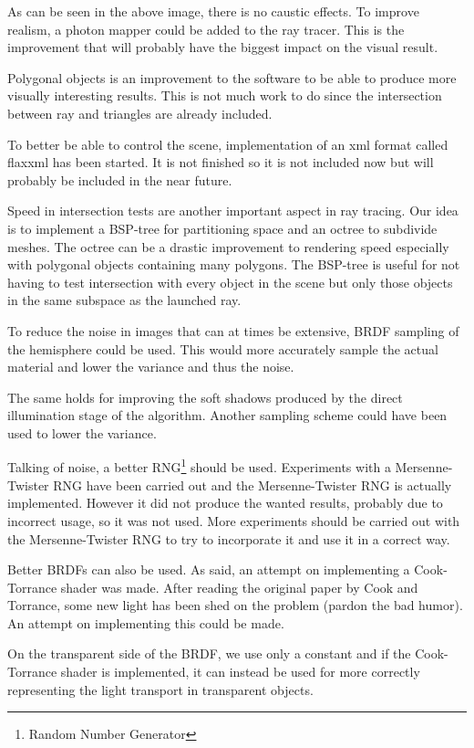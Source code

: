 \documentclass[a4paper]{report}
\begin{document}
As can be seen in the above image, there is no caustic effects. To
improve realism, a photon mapper could be added to the ray
tracer. This is the improvement that will probably have the biggest
impact on the visual result.

Polygonal objects is an improvement to the software to be able to
produce more visually interesting results. This is not much work to do
since the intersection between ray and triangles are already included.

To better be able to control the scene, implementation of an xml
format called flaxxml has been started. It is not finished so it is
not included now but will probably be included in the near future.

Speed in intersection tests are another important aspect in ray
tracing. Our idea is to implement a BSP-tree for partitioning space
and an octree to subdivide meshes. The octree can be a drastic improvement
to rendering speed especially with polygonal objects containing many
polygons. The BSP-tree is useful for not having to test intersection
with every object in the scene but only those objects in the same
subspace as the launched ray.

To reduce the noise in images that can at times be extensive, BRDF
sampling of the hemisphere could be used. This would more accurately
sample the actual material and lower the variance and thus the noise.

The same holds for improving the soft shadows produced by the direct
illumination stage of the algorithm. Another sampling scheme could
have been used to lower the variance.

Talking of noise, a better RNG\footnote{Random Number Generator} should be
used. Experiments with a Mersenne-Twister RNG have been carried out
and the Mersenne-Twister RNG is actually implemented. However it did
not produce the wanted results, probably due to incorrect usage, so it
was not used. More experiments should be carried out with the
Mersenne-Twister RNG to try to incorporate it and use it in a correct way.

Better BRDFs can also be used. As said, an attempt on implementing a
Cook-Torrance shader was made. After reading the original paper by
Cook and Torrance, some new light has been shed on the problem (pardon
the bad humor). An attempt on implementing this could be made.

On the transparent side of the BRDF, we use only a constant and if the
Cook-Torrance shader is implemented, it can instead be used for more
correctly representing the light transport in transparent objects.
\end{document}
